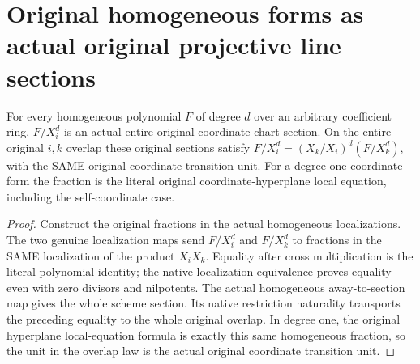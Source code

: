 \section{Original homogeneous forms as actual original projective line sections}

\begin{lemma}
\label{lem:fc-original-homogeneous-form-coefficients}
\leanok
{}
For every homogeneous polynomial $F$ of degree $d$ over an arbitrary coefficient
ring, $F/X_i^d$ is an actual entire original coordinate-chart section.  On the
entire original $i,k$ overlap these original sections satisfy
$F/X_i^d=(X_k/X_i)^d(F/X_k^d)$, with the SAME original coordinate-transition unit.
For a degree-one coordinate form the fraction is the literal original
coordinate-hyperplane local equation, including the self-coordinate case.
\end{lemma}
\begin{proof}
Construct the original fractions in the actual homogeneous localizations.
The two genuine localization maps send $F/X_i^d$ and $F/X_k^d$ to fractions
in the SAME localization of the product $X_iX_k$.  Equality after cross
multiplication is the literal polynomial identity; the native localization
equivalence proves equality even with zero divisors and nilpotents.
The actual homogeneous away-to-section map gives the whole scheme section.
Its native restriction naturality transports the preceding equality to the
whole original overlap.  In degree one, the original hyperplane local-equation
formula is exactly this same homogeneous fraction, so the unit in the overlap
law is the actual original coordinate transition unit.
\end{proof}

